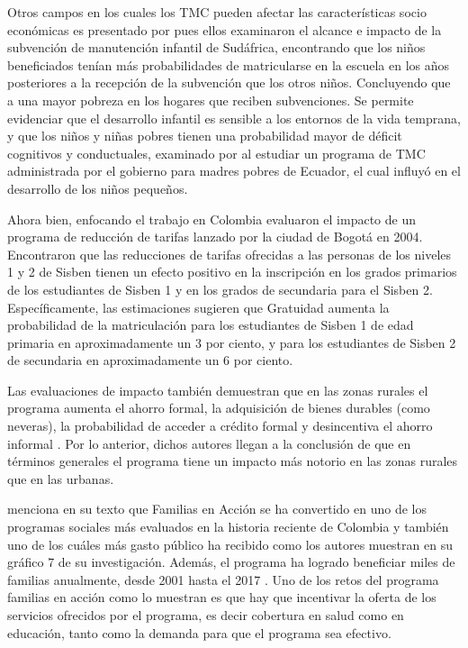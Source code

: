 \documentclass[AER]{AEA}
\begin{document}
Otros campos en los cuales los TMC pueden afectar las características socio económicas es presentado por \cite{Case2005HeKwaZulu-Natal} pues ellos examinaron el alcance e impacto de la subvención de manutención infantil de Sudáfrica, encontrando que los niños beneficiados tenían más probabilidades de matricularse en la escuela en los años posteriores a la recepción de la subvención que los otros niños. Concluyendo que a una mayor pobreza en los hogares que reciben subvenciones. Se permite evidenciar que el desarrollo infantil es sensible a los entornos de la vida temprana, y que los niños y niñas pobres tienen una probabilidad mayor de déficit cognitivos y conductuales, examinado por \cite{Paxson2010DoesAnd} al estudiar un programa de TMC administrada por el gobierno para madres pobres de Ecuador, el cual influyó en el desarrollo de los niños pequeños.

Ahora bien, enfocando el trabajo en Colombia \cite{Barrera-Osorio2007TheQuasi-experiment} evaluaron el impacto de un programa de reducción de tarifas lanzado por la ciudad de Bogotá en 2004. Encontraron que las reducciones de tarifas ofrecidas a las personas de los niveles 1 y 2 de Sisben tienen un efecto positivo en la inscripción en los grados primarios de los estudiantes de Sisben 1 y en los grados de secundaria para el Sisben 2. Específicamente, las estimaciones sugieren que Gratuidad aumenta la probabilidad de la matriculación para los estudiantes de Sisben 1 de edad primaria en aproximadamente un 3 por ciento, y para los estudiantes de Sisben 2 de secundaria en aproximadamente un 6 por ciento.

Las evaluaciones de impacto también demuestran que en las zonas rurales el programa aumenta el ahorro formal, la adquisición de bienes durables (como neveras), la probabilidad de acceder a crédito formal y desincentiva el ahorro informal \cite{Robles2018Las2001-2018}. Por lo anterior, dichos autores llegan a la conclusión de que en términos generales el programa tiene un impacto más notorio en las zonas rurales que en las urbanas.

 \cite{Robles2018Las2001-2018} menciona en su texto que Familias en Acción se ha convertido en uno de los programas sociales más evaluados en la historia reciente de Colombia y también uno de los cuáles más gasto público ha recibido como los autores muestran en su gráfico 7 de su investigación. Además, el programa ha logrado beneficiar miles de familias anualmente, desde 2001 hasta el 2017 \citep{Robles2018Las2001-2018}. Uno de los retos del programa familias en acción como lo muestran \cite{Robles2018Las2001-2018} es que hay que incentivar la oferta de los servicios ofrecidos por el programa, es decir cobertura en salud como en educación, tanto como la demanda para que el programa sea efectivo.
\end{document}
